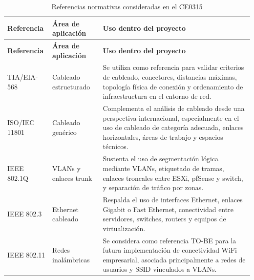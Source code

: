 \documentclass[11pt, a4paper, oneside]{report}
\begin{document}
\begin{xltabular}{\textwidth}{@{}|L{3.5cm}|L{3.8cm}|X|@{}}
\caption{Referencias normativas consideradas en el CE0315}
\label{tab:referencias_normativas_ce0315} \\

\parbox[c][1.1cm][c]{\linewidth}{\centering\color{white}\bfseries\small Referencia} &
\parbox[c][1.1cm][c]{\linewidth}{\centering\color{white}\bfseries\small Área de aplicación} &
\parbox[c][1.1cm][c]{\linewidth}{\centering\color{white}\bfseries\small Uso dentro del proyecto} \\ \hline
\endfirsthead

\parbox[c][1.1cm][c]{\linewidth}{\centering\color{white}\bfseries\small Referencia} &
\parbox[c][1.1cm][c]{\linewidth}{\centering\color{white}\bfseries\small Área de aplicación} &
\parbox[c][1.1cm][c]{\linewidth}{\centering\color{white}\bfseries\small Uso dentro del proyecto} \\ \hline
\endhead

\hline
\endfoot

{\small TIA/EIA-568} &
{\small Cableado estructurado} &
{\small Se utiliza como referencia para validar criterios de cableado, conectores, distancias máximas, topología física de conexión y ordenamiento de infraestructura en el entorno de red.} \\ \hline

{\small ISO/IEC 11801} &
{\small Cableado genérico} &
{\small Complementa el análisis de cableado desde una perspectiva internacional, especialmente en el uso de cableado de categoría adecuada, enlaces horizontales, áreas de trabajo y espacios técnicos.} \\ \hline

{\small IEEE 802.1Q} &
{\small VLANs y enlaces trunk} &
{\small Sustenta el uso de segmentación lógica mediante VLANs, etiquetado de tramas, enlaces troncales entre ESXi, pfSense y switch, y separación de tráfico por zonas.} \\ \hline

{\small IEEE 802.3} &
{\small Ethernet cableado} &
{\small Respalda el uso de interfaces Ethernet, enlaces Gigabit o Fast Ethernet, conectividad entre servidores, switches, routers y equipos de virtualización.} \\ \hline

{\small IEEE 802.11} &
{\small Redes inalámbricas} &
{\small Se considera como referencia TO-BE para la futura implementación de conectividad WiFi empresarial, asociada principalmente a redes de usuarios y SSID vinculados a VLANs.} \\ \hline


\end{xltabular}
\end{document}
